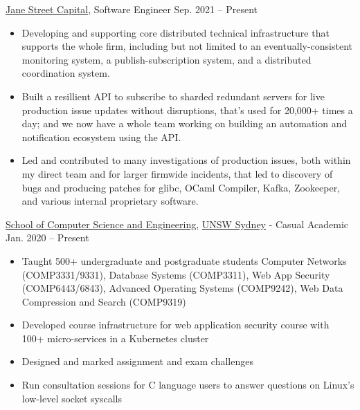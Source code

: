 \documentclass[hidelinks__VERSION__]{adamyi-cv}
\begin{document}
\begin{entrylist}

\entry
{\href{https://www.janestreet.com/}{Jane Street Capital}, Software Engineer}
{Sep. 2021 -- Present}
{
\begin{minipage}[t]{1\linewidth}
\begin{itemize}[leftmargin=*,align=left,noitemsep]
\item Developing and supporting core distributed technical infrastructure that supports the whole firm, including but not limited to an eventually-consistent monitoring system, a publish-subscription system, and a distributed coordination system.
\item Built a resillient API to subscribe to sharded redundant servers for live production issue updates without disruptions, that's used for 20,000+ times a day; and we now have a whole team working on building an automation and notification ecosystem using the API.
\item Led and contributed to many investigations of production issues, both within my direct team and for larger firmwide incidents, that led to discovery of bugs and producing patches for glibc, OCaml Compiler, Kafka, Zookeeper, and various internal proprietary software.
\end{itemize}
\end{minipage}
}


\entry
{\href{https://www.cse.unsw.edu.au/}{School of Computer Science and Engineering}, \href{https://unsw.edu.au/}{UNSW Sydney} - Casual Academic}
{Jan. 2020 -- Present}
{
\begin{minipage}[t]{1\linewidth}
\begin{itemize}[leftmargin=*,align=left,noitemsep]
\item Taught 500+ undergraduate and postgraduate students Computer Networks (COMP3331/9331), Database Systems (COMP3311), Web App Security (COMP6443/6843), Advanced Operating Systems (COMP9242), Web Data Compression and Search (COMP9319)
\item Developed course infrastructure for web application security course with 100+ micro-services in a Kubernetes cluster
\item Designed and marked assignment and exam challenges
\item Run consultation sessions for C language users to answer questions on Linux's low-level socket syscalls
\end{itemize}
\end{minipage}
}


\end{entrylist}
\end{document}
